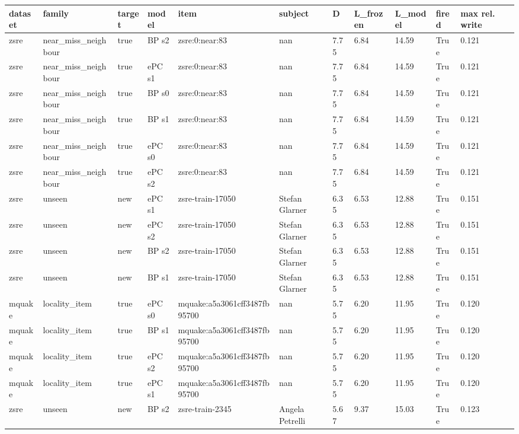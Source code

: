 \documentclass[10pt,a4paper]{article}
\begin{document}
\begin{center}\tiny
\begin{tabularx}{\textwidth}{@{}p{}XXXXXXXXXX@{}}
\toprule
dataset & family & target & model & item & subject & D & L\_frozen & L\_model & fired & max rel. write \\ \midrule
zsre & near\_miss\_neighbour & true & BP s2 & zsre:0:near:83 & nan & 7.75 & 6.84 & 14.59 & True & 0.121 \\
zsre & near\_miss\_neighbour & true & ePC s1 & zsre:0:near:83 & nan & 7.75 & 6.84 & 14.59 & True & 0.121 \\
zsre & near\_miss\_neighbour & true & BP s0 & zsre:0:near:83 & nan & 7.75 & 6.84 & 14.59 & True & 0.121 \\
zsre & near\_miss\_neighbour & true & BP s1 & zsre:0:near:83 & nan & 7.75 & 6.84 & 14.59 & True & 0.121 \\
zsre & near\_miss\_neighbour & true & ePC s0 & zsre:0:near:83 & nan & 7.75 & 6.84 & 14.59 & True & 0.121 \\
zsre & near\_miss\_neighbour & true & ePC s2 & zsre:0:near:83 & nan & 7.75 & 6.84 & 14.59 & True & 0.121 \\
zsre & unseen & new & ePC s1 & zsre-train-17050 & Stefan Glarner & 6.35 & 6.53 & 12.88 & True & 0.151 \\
zsre & unseen & new & ePC s2 & zsre-train-17050 & Stefan Glarner & 6.35 & 6.53 & 12.88 & True & 0.151 \\
zsre & unseen & new & BP s2 & zsre-train-17050 & Stefan Glarner & 6.35 & 6.53 & 12.88 & True & 0.151 \\
zsre & unseen & new & BP s1 & zsre-train-17050 & Stefan Glarner & 6.35 & 6.53 & 12.88 & True & 0.151 \\
mquake & locality\_item & true & ePC s0 & mquake:a5a3061cff3487fb95700 & nan & 5.75 & 6.20 & 11.95 & True & 0.120 \\
mquake & locality\_item & true & BP s1 & mquake:a5a3061cff3487fb95700 & nan & 5.75 & 6.20 & 11.95 & True & 0.120 \\
mquake & locality\_item & true & ePC s2 & mquake:a5a3061cff3487fb95700 & nan & 5.75 & 6.20 & 11.95 & True & 0.120 \\
mquake & locality\_item & true & ePC s1 & mquake:a5a3061cff3487fb95700 & nan & 5.75 & 6.20 & 11.95 & True & 0.120 \\
zsre & unseen & new & BP s2 & zsre-train-2345 & Angela Petrelli & 5.67 & 9.37 & 15.03 & True & 0.123 \\
\bottomrule
\end{tabularx}
\end{center}
\end{document}
